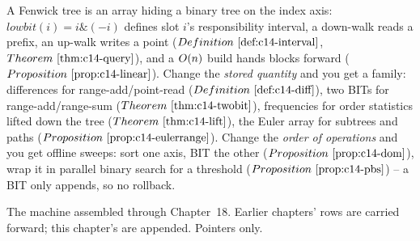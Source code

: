 \begin{recallbox}
A Fenwick tree is an array hiding a binary tree on the index axis: \(\mathit{lowbit}(i)=i\&(-i)\)
defines slot \(i\)'s responsibility interval, a down-walk reads a prefix, an
up-walk writes a point (\(\defref{c14-interval}\), \(\thmref{c14-query}\)), and a
\(O(n)\) build hands blocks forward (\(\propref{c14-linear}\)). Change the
\emph{stored quantity} and you get a family: differences for range-add/point-read
(\(\defref{c14-diff}\)), two BITs for range-add/range-sum (\(\thmref{c14-twobit}\)),
frequencies for order statistics lifted down the tree (\(\thmref{c14-lift}\)), the
Euler array for subtrees and paths (\(\propref{c14-eulerrange}\)). Change the
\emph{order of operations} and you get offline sweeps: sort one axis, BIT the
other (\(\propref{c14-dom}\)), wrap it in parallel binary search for a threshold
(\(\propref{c14-pbs}\)) -- a BIT only appends, so no rollback.
\end{recallbox}


The machine assembled through Chapter~18. Earlier chapters' rows are carried
forward; this chapter's are appended. Pointers only.

